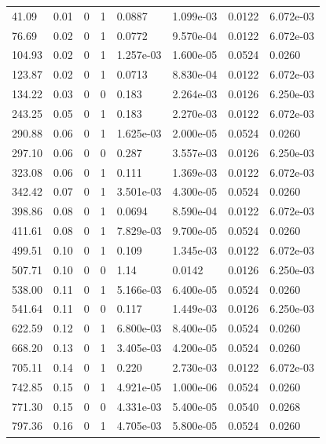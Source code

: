 \documentclass[preview]{standalone}
\begin{document}
{{\begin{tabular}{L{1.2cm}C{1.2cm} C{0.3cm}C{0.5cm} C{1.4cm}C{1.4cm} C{1.4cm}C{1.4cm}}
  41.09  &  0.01  & 0     &  1 &  0.0887  & 1.099e-03  & 0.0122 &  6.072e-03   \\ 
  76.69  &  0.02  & 0     &  1 &  0.0772  & 9.570e-04  & 0.0122 &  6.072e-03   \\ 
  104.93  &  0.02  & 0     &  1 &  1.257e-03  & 1.600e-05  & 0.0524 &  0.0260   \\ 
  123.87  &  0.02  & 0     &  1 &  0.0713  & 8.830e-04  & 0.0122 &  6.072e-03   \\ 
  134.22  &  0.03  & 0     &  0 &  0.183  & 2.264e-03  & 0.0126 &  6.250e-03   \\ 
  243.25  &  0.05  & 0     &  1 &  0.183  & 2.270e-03  & 0.0122 &  6.072e-03   \\ 
  290.88  &  0.06  & 0     &  1 &  1.625e-03  & 2.000e-05  & 0.0524 &  0.0260   \\ 
  297.10  &  0.06  & 0     &  0 &  0.287  & 3.557e-03  & 0.0126 &  6.250e-03   \\ 
  323.08  &  0.06  & 0     &  1 &  0.111  & 1.369e-03  & 0.0122 &  6.072e-03   \\ 
  342.42  &  0.07  & 0     &  1 &  3.501e-03  & 4.300e-05  & 0.0524 &  0.0260   \\ 
  398.86  &  0.08  & 0     &  1 &  0.0694  & 8.590e-04  & 0.0122 &  6.072e-03   \\ 
  411.61  &  0.08  & 0     &  1 &  7.829e-03  & 9.700e-05  & 0.0524 &  0.0260   \\ 
  499.51  &  0.10  & 0     &  1 &  0.109  & 1.345e-03  & 0.0122 &  6.072e-03   \\ 
  507.71  &  0.10  & 0     &  0 &  1.14  & 0.0142  & 0.0126 &  6.250e-03   \\ 
  538.00  &  0.11  & 0     &  1 &  5.166e-03  & 6.400e-05  & 0.0524 &  0.0260   \\ 
  541.64  &  0.11  & 0     &  0 &  0.117  & 1.449e-03  & 0.0126 &  6.250e-03   \\ 
  622.59  &  0.12  & 0     &  1 &  6.800e-03  & 8.400e-05  & 0.0524 &  0.0260   \\ 
  668.20  &  0.13  & 0     &  1 &  3.405e-03  & 4.200e-05  & 0.0524 &  0.0260   \\ 
  705.11  &  0.14  & 0     &  1 &  0.220  & 2.730e-03  & 0.0122 &  6.072e-03   \\ 
  742.85  &  0.15  & 0     &  1 &  4.921e-05  & 1.000e-06  & 0.0524 &  0.0260   \\ 
  771.30  &  0.15  & 0     &  0 &  4.331e-03  & 5.400e-05  & 0.0540 &  0.0268   \\ 
  797.36  &  0.16  & 0     &  1 &  4.705e-03  & 5.800e-05  & 0.0524 &  0.0260   \\ 

\end{tabular}}}
\end{document}
